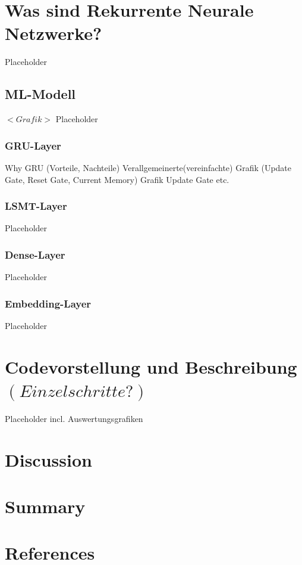 \documentclass[12pt,a4paper]{article}
\begin{document}
\section{Was sind Rekurrente Neurale Netzwerke?}
Placeholder

\subsection{ML-Modell}
$<Grafik>$ \newline
Placeholder
\subsubsection{GRU-Layer}
Why GRU (Vorteile, Nachteile) \newline
Verallgemeinerte(vereinfachte) Grafik (Update Gate, Reset Gate, Current Memory)\newline
Grafik Update Gate\newline
etc.
\subsubsection{LSMT-Layer}
Placeholder
\subsubsection{Dense-Layer}
Placeholder
\subsubsection{Embedding-Layer}
Placeholder
\section{Codevorstellung und Beschreibung$(Einzelschritte?)$}
Placeholder incl. Auswertungsgrafiken
\newpage

\section{Discussion}
\section{Summary}
\section{References}
\end{document}

